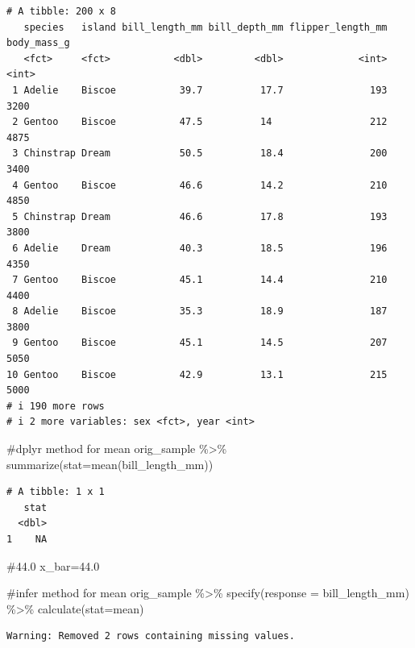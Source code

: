 \documentclass[
  letterpaper,
  DIV=11,
  numbers=noendperiod]{scrartcl}
\newenvironment{Shaded}{\begin{snugshade}}{\end{snugshade}}
\newcommand{\AttributeTok}[1]{\textcolor[rgb]{0.40,0.45,0.13}{#1}}
\newcommand{\CommentTok}[1]{\textcolor[rgb]{0.37,0.37,0.37}{#1}}
\newcommand{\FloatTok}[1]{\textcolor[rgb]{0.68,0.00,0.00}{#1}}
\newcommand{\FunctionTok}[1]{\textcolor[rgb]{0.28,0.35,0.67}{#1}}
\newcommand{\NormalTok}[1]{\textcolor[rgb]{0.00,0.23,0.31}{#1}}
\newcommand{\OtherTok}[1]{\textcolor[rgb]{0.00,0.23,0.31}{#1}}
\newcommand{\SpecialCharTok}[1]{\textcolor[rgb]{0.37,0.37,0.37}{#1}}
\newcommand{\StringTok}[1]{\textcolor[rgb]{0.13,0.47,0.30}{#1}}
\begin{document}
\begin{verbatim}
# A tibble: 200 x 8
   species   island bill_length_mm bill_depth_mm flipper_length_mm body_mass_g
   <fct>     <fct>           <dbl>         <dbl>             <int>       <int>
 1 Adelie    Biscoe           39.7          17.7               193        3200
 2 Gentoo    Biscoe           47.5          14                 212        4875
 3 Chinstrap Dream            50.5          18.4               200        3400
 4 Gentoo    Biscoe           46.6          14.2               210        4850
 5 Chinstrap Dream            46.6          17.8               193        3800
 6 Adelie    Dream            40.3          18.5               196        4350
 7 Gentoo    Biscoe           45.1          14.4               210        4400
 8 Adelie    Biscoe           35.3          18.9               187        3800
 9 Gentoo    Biscoe           45.1          14.5               207        5050
10 Gentoo    Biscoe           42.9          13.1               215        5000
# i 190 more rows
# i 2 more variables: sex <fct>, year <int>
\end{verbatim}

\begin{Shaded}
\begin{Highlighting}[]
\CommentTok{\#dplyr method for mean}
\NormalTok{orig\_sample }\SpecialCharTok{\%\textgreater{}\%}
  \FunctionTok{summarize}\NormalTok{(}\AttributeTok{stat=}\FunctionTok{mean}\NormalTok{(bill\_length\_mm))}
\end{Highlighting}
\end{Shaded}

\begin{verbatim}
# A tibble: 1 x 1
   stat
  <dbl>
1    NA
\end{verbatim}

\begin{Shaded}
\begin{Highlighting}[]
\CommentTok{\#44.0}
\NormalTok{x\_bar}\OtherTok{=}\FloatTok{44.0}


\CommentTok{\#infer method for mean}
\NormalTok{orig\_sample }\SpecialCharTok{\%\textgreater{}\%}
  \FunctionTok{specify}\NormalTok{(}\AttributeTok{response =}\NormalTok{ bill\_length\_mm) }\SpecialCharTok{\%\textgreater{}\%}
  \FunctionTok{calculate}\NormalTok{(}\AttributeTok{stat=}\StringTok{\textquotesingle{}mean\textquotesingle{}}\NormalTok{)}
\end{Highlighting}
\end{Shaded}

\begin{verbatim}
Warning: Removed 2 rows containing missing values.
\end{verbatim}
\end{document}

